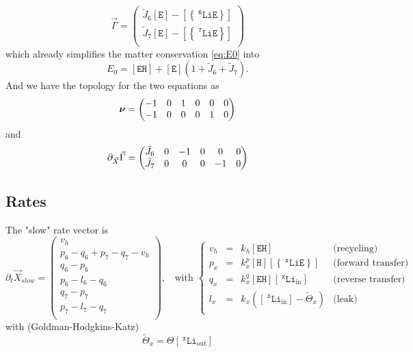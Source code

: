 \documentclass[aps,onecolumn,12pt]{revtex4}
\newcommand{\mychem}[1]{\mathtt{#1}}
\newcommand{\myconc}[1]{\left\lbrack{#1}\right\rbrack}
\newcommand{\spLi}[1]{{~^{\mychem{#1}}\mychem{Li}}}
\newcommand{\spEout}{\mychem{E}}
\newcommand{\Eout}{\myconc{\spEout}}
\newcommand{\spLiE}[1]{\left\lbrace\spLi{#1}\spEout\right\rbrace}
\newcommand{\LiE}[1]{\myconc{\spLiE{#1}}}
\newcommand{\spLiIn}[1]{{\spLi{#1}}_{\mathrm{in}}}
\newcommand{\LiIn}[1]{\myconc{\spLiIn{#1}}}
\newcommand{\spLiOut}[1]{{\spLi{#1}}_{\mathrm{out}}}
\newcommand{\LiOut}[1]{\myconc{\spLiOut{#1}}}
\newcommand{\spEHin}{\mychem{EH}}
\newcommand{\EHin}{\myconc{\spEHin}}
\newcommand{\spproton}{\mychem{H}}
\newcommand{\proton}{\myconc{\spproton}}
\newcommand{\mymat}[1]{{\bm{#1}}}
\begin{document}
\begin{equation}
\vec{\Gamma} = 
\begin{pmatrix}
	\tilde{J}_6 \Eout - \LiE{6} \\
	\tilde{J}_7 \Eout - \LiE{7} \\
\end{pmatrix}
\end{equation}
which already simplifies the matter conservation \eqref{eq:E0} into
\begin{equation}
	E_0 = \EHin + \Eout \left(1+\tilde{J}_6+\tilde{J}_7\right).
\end{equation}
And we have the topology for the two equations as
\begin{equation}
	\label{eq:Nu}
	\mymat{\nu}=\begin{pmatrix}-1 & 0 & 1 & 0 & 0 & 0\cr -1 & 0 & 0 & 0 & 1 & 0\end{pmatrix}
\end{equation}
and
\begin{equation}
	\partial_{\vec{X}}\vec{\Gamma} = 
	\begin{pmatrix}\tilde{J}_6 & 0 & -1 & 0 & 0 & 0\cr\tilde{J}_7 & 0 & 0 & 0 & -1 & 0\end{pmatrix}
\end{equation}

\subsection{Rates}

The "slow" rate vector is
\begin{equation}
	\partial_t\vec{X}_{slow} = 
	\begin{pmatrix}
		v_h\\
		p_6-q_6+p_7-q_7-v_h\\
		q_6-p_6\\
		p_6-l_6-q_6\\
		q_7-p_7\\
		p_7-l_7-q_7\\
	\end{pmatrix}
	,\;\;\text{ with }
	\left\lbrace
	\begin{array}{rcll}
	v_h & = & k_h \EHin & \text{(recycling)}\\
	p_x & = & k_x^p \proton \LiE{x} & \text{(forward transfer)}\\
	q_x & = & k_x^q \EHin \LiIn{x} & \text{(reverse transfer)} \\
	l_x & = & k_x  \left(\LiIn{x}-\tilde{\Theta}_x\right) & \text{(leak)}\\
	\end{array}
	\right.
\end{equation}
with (Goldman-Hodgkins-Katz)
\begin{equation}
	\tilde{\Theta}_x = \Theta \LiOut{x}
\end{equation}
\end{document}
